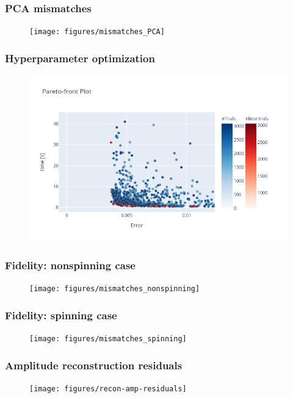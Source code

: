 \documentclass{beamer}
\begin{document}
\begin{frame}
    \frametitle{PCA mismatches}
    \begin{figure}[ht]
    \centering
    \texttt{[image: figures/mismatches\_PCA]}
    \label{fig:mismatches_PCA}
    \end{figure}
\end{frame}

\begin{frame}
    \frametitle{Hyperparameter optimization}
    \begin{figure}[ht]
    \centering
    \includegraphics[width=\textwidth]{figures/pareto-front-nonspinning}
    \label{fig:pareto-front-nonspinning}
    \end{figure}
\end{frame}

\begin{frame}
    \frametitle{Fidelity: nonspinning case}
    \begin{figure}[ht]
    \centering
    \texttt{[image: figures/mismatches\_nonspinning]}
    \label{fig:mismatches_nonspinning}
    \end{figure}
\end{frame}

\begin{frame}
    \frametitle{Fidelity: spinning case}
    \begin{figure}[ht]
    \centering
    \texttt{[image: figures/mismatches\_spinning]}
    \end{figure}
\end{frame}

\begin{frame}
    \frametitle{Amplitude reconstruction residuals}
    \begin{figure}[ht]
    \centering
    \texttt{[image: figures/recon-amp-residuals]}
    \label{fig:recon-amp-residuals}
    \end{figure}
\end{frame}
\end{document}
